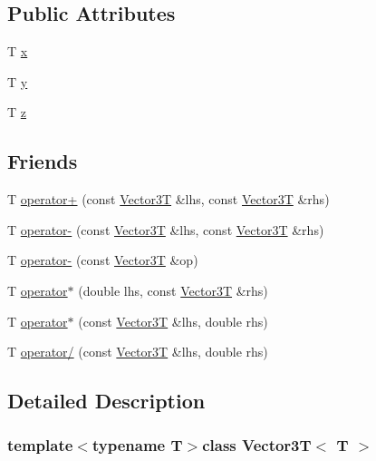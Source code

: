 \subsection*{Public Attributes}
\begin{DoxyCompactItemize}
\item 
T \hyperlink{class_vector3_t_aa61f9e6d2239f9d69c281a1440792379}{x}
\item 
T \hyperlink{class_vector3_t_a73c0800c5d08a252de7b03c97accb9ee}{y}
\item 
T \hyperlink{class_vector3_t_a591f9ca70ccc639c62790797d3edaa39}{z}
\end{DoxyCompactItemize}
\subsection*{Friends}
\begin{DoxyCompactItemize}
\item 
T \hyperlink{class_vector3_t_a8fad506cfcf9c616b7e9c77958991d70}{operator+} (const \hyperlink{class_vector3_t}{Vector3\+T} \&lhs, const \hyperlink{class_vector3_t}{Vector3\+T} \&rhs)
\item 
T \hyperlink{class_vector3_t_a1f38493d72860421c81fb0ddc838575c}{operator-\/} (const \hyperlink{class_vector3_t}{Vector3\+T} \&lhs, const \hyperlink{class_vector3_t}{Vector3\+T} \&rhs)
\item 
T \hyperlink{class_vector3_t_a0f0bb4990e11064035fca754c1f5e786}{operator-\/} (const \hyperlink{class_vector3_t}{Vector3\+T} \&op)
\item 
T \hyperlink{class_vector3_t_a1c5739e109bc0df4077e72e3d5a15945}{operator$\ast$} (double lhs, const \hyperlink{class_vector3_t}{Vector3\+T} \&rhs)
\item 
T \hyperlink{class_vector3_t_a7d96104e52a3f76d271617168cc782f3}{operator$\ast$} (const \hyperlink{class_vector3_t}{Vector3\+T} \&lhs, double rhs)
\item 
T \hyperlink{class_vector3_t_a6a04507b553855f430d09b79be9036f7}{operator/} (const \hyperlink{class_vector3_t}{Vector3\+T} \&lhs, double rhs)
\end{DoxyCompactItemize}


\subsection{Detailed Description}
\subsubsection*{template$<$typename T$>$class Vector3\+T$<$ T $>$}



